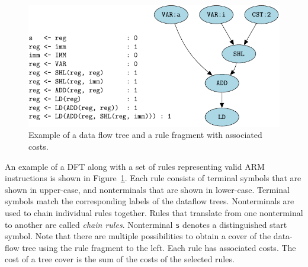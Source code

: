 \begin{figure}[ht]
  \begin{center}



    \includegraphics{pgf-fig002}
  \end{center}
  \caption{Example of a data flow tree and a rule fragment with
    associated costs.}\label{fig:tpm}
\end{figure}

An example of a DFT along with a set of rules representing valid ARM
instructions is shown in Figure~\ref{fig:tpm}. Each rule consists of
terminal symbols that are shown in upper-case, and nonterminals that
are shown in lower-case. Terminal symbols match the corresponding
labels of the dataflow trees. Nonterminals are used to chain
individual rules together. Rules that translate from one nonterminal
to another are called \emph{chain rules}. Nonterminal \texttt{s}
denotes a distinguished start symbol. Note that there are multiple
possibilities to obtain a cover of the data-flow tree using the rule
fragment to the left. Each rule has associated costs. The cost of a
tree cover is the sum of the costs of the selected rules.

